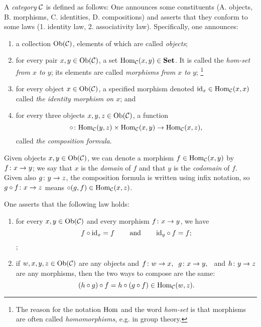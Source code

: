 \documentclass[CT4S-EN-RU]{subfiles}
\begin{document}
\begin{blockRUS}
\end{blockRUS}

\begin{definitionENG}\label{def:category}
A {\em category} $\mathcal{C}$ is defined as follows: One announces some constituents (A. objects, B. morphisms, C. identities, D. compositions) and asserts that they conform to some laws (1. identity law, 2. associativity law). Specifically, one announces:
\begin{enumerate}[\hsp A.]
\item a collection $\textnormal{Ob}(\mathcal{C})$, elements of which are called {\em objects};
\item for every pair $x,y\in\textnormal{Ob}(\mathcal{C})$, a set $\textnormal{Hom}_\mathcal{C}(x,y)\in{\mathbf{Set}}$. It is called the {\em hom-set from $x$ to $y$}; its elements are called {\em morphisms from $x$ to $y$};
\footnote{The reason for the notation $\textnormal{Hom}$ and the word {\em hom-set} is that morphisms are often called {\em homomorphisms}, e.g. in group theory.}
\item for every object $x\in\textnormal{Ob}(\mathcal{C})$, a specified morphism denoted $\textnormal{id}_x\in\textnormal{Hom}_\mathcal{C}(x,x)$ called {\em the identity morphism on $x$}; and
\item for every three objects $x,y,z\in\textnormal{Ob}(\mathcal{C})$, a function $$\circ\colon\textnormal{Hom}_\mathcal{C}(y,z)\times\textnormal{Hom}_\mathcal{C}(x,y)\rightarrow\textnormal{Hom}_\mathcal{C}(x,z),$$ called {\em the composition formula}.
\end{enumerate}
Given objects $x,y\in\textnormal{Ob}(\mathcal{C})$, we can denote a morphism $f\in\textnormal{Hom}_\mathcal{C}(x,y)$ by $f\colon x\rightarrow y$; we say that $x$ is the {\em domain} of $f$ and that $y$ is the {\em codomain} of $f$. Given also $g\colon y\rightarrow z$, the composition formula is written using infix notation, so $g\circ f\colon x\rightarrow z$ means $\circ(g,f)\in\textnormal{Hom}_\mathcal{C}(x,z)$.

One asserts that the following law holds:
\begin{enumerate}[\hsp 1.]
\item for every $x,y\in\textnormal{Ob}(\mathcal{C})$ and every morphism $f\colon x\rightarrow y$, we have
$$f\circ\textnormal{id}_x=f\hspace{.3in}\textnormal{and}\hspace{.3in}\textnormal{id}_y\circ f=f;$$ ;
\item if $w,x,y,z\in\textnormal{Ob}(\mathcal{C})$ are any objects and $f\colon w\rightarrow x,\;\;g\colon x\rightarrow y,\;\;$ and $h\colon y\rightarrow z$ are any morphisms, then the two ways to compose are the same:$$(h\circ g)\circ f = h\circ(g\circ f) \in\textnormal{Hom}_\mathcal{C}(w,z).$$
\end{enumerate}
\end{definitionENG}
\end{document}
